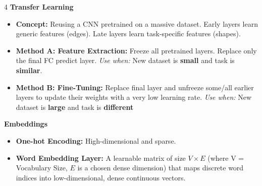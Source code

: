 \documentclass[8pt,landscape,a4paper]{extarticle}
\begin{document}
\begin{multicols*}{4}
\vspace{1mm}
\noindent\textbf{Transfer Learning}
\begin{itemize}[leftmargin=*, nosep]
    \item \textbf{Concept:} Reusing a CNN pretrained on a massive dataset. Early layers learn generic features (edges). Late layers learn task-specific features (shapes).
    \item \textbf{Method A: Feature Extraction:} Freeze all pretrained layers. Replace only the final FC predict layer. 
    \textit{Use when:} New dataset is \textbf{small} and task is \textbf{similar}.
    \item \textbf{Method B: Fine-Tuning:} Replace final layer and unfreeze some/all earlier layers to update their weights with a very low learning rate.
    \textit{Use when:} New dataset is \textbf{large} and task is \textbf{different}
\end{itemize}

\noindent\textbf{Embeddings}
\begin{itemize}[leftmargin=*, nosep]
    \item \textbf{One-hot Encoding:} High-dimensional and sparse.
    \item \textbf{Word Embedding Layer:} A learnable matrix of size $V \times E$ (where V = Vocabulary Size, $E$ is a chosen dense dimension) that maps discrete word indices into low-dimensional, dense continuous vectors.
\end{itemize}


\end{multicols*}
\end{document}
